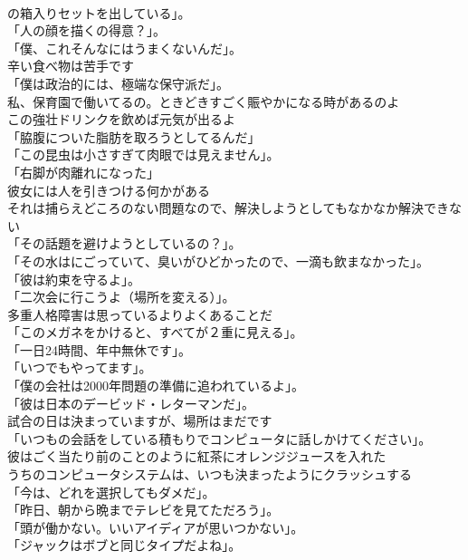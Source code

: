 \documentclass[8pt]{extreport}
\begin{document}
\begin{CJK}{UTF8}{min}
\\	の箱入りセットを出している」。	
\\	「人の顔を描くの得意？」。	
\\	「僕、これそんなにはうまくないんだ」。	
\\	辛い食べ物は苦手です	
\\	「僕は政治的には、極端な保守派だ」。	
\\	私、保育園で働いてるの。ときどきすごく賑やかになる時があるのよ	
\\	この強壮ドリンクを飲めば元気が出るよ	
\\	「脇腹についた脂肪を取ろうとしてるんだ」	
\\	「この昆虫は小さすぎて肉眼では見えません」。	
\\	「右脚が肉離れになった」	
\\	彼女には人を引きつける何かがある	
\\	それは捕らえどころのない問題なので、解決しようとしてもなかなか解決できない	
\\	「その話題を避けようとしているの？」。	
\\	「その水はにごっていて、臭いがひどかったので、一滴も飲まなかった」。	
\\	「彼は約束を守るよ」。	
\\	「二次会に行こうよ（場所を変える）」。	
\\	多重人格障害は思っているよりよくあることだ	
\\	「このメガネをかけると、すべてが２重に見える」。	
\\	「一日24時間、年中無休です」。	
\\	「いつでもやってます」。	
\\	「僕の会社は2000年問題の準備に追われているよ」。	
\\	「彼は日本のデービッド・レターマンだ」。	
\\	試合の日は決まっていますが、場所はまだです	
\\	「いつもの会話をしている積もりでコンピュータに話しかけてください」。	
\\	彼はごく当たり前のことのように紅茶にオレンジジュースを入れた	
\\	うちのコンピュータシステムは、いつも決まったようにクラッシュする	
\\	「今は、どれを選択してもダメだ」。	
\\	「昨日、朝から晩までテレビを見てただろう」。	
\\	「頭が働かない。いいアイディアが思いつかない」。	
\\	「ジャックはボブと同じタイプだよね」。	

\end{CJK}
\end{document}
